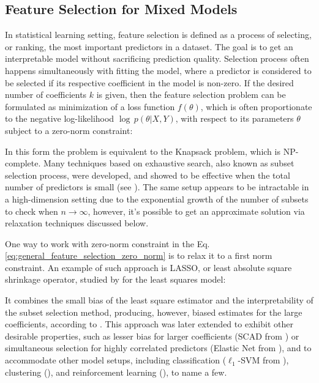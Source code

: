\documentclass[11pt,letterpaper]{article}
\numberwithin{equation}{section} %
\numberwithin{figure}{section} %
\numberwithin{table}{section} %
\begin{document}
\subsection{Feature Selection for Mixed Models}
\label{ch:feature_selection_for_mixed_models}
In statistical learning setting, feature selection is defined as a process of selecting, or ranking, the most important predictors in a dataset. The goal is to get an interpretable model without sacrificing prediction quality. Selection process often happens simultaneously with fitting the model, where a predictor is considered to be selected if its respective coefficient in the model is non-zero. If the desired number of coefficients $k$ is given, then  the feature selection problem can be formulated as minimization of a loss function $f(\theta)$, which is  often proportionate to the negative log-likelihood $\log\, p(\theta| X, Y)$, with respect to its parameters $\theta$ subject to a zero-norm constraint:


 In this form the problem is equivalent to the Knapsack problem, which is NP-complete. Many techniques based on exhaustive search, also known as subset selection process, were developed, and showed to be effective when the total number of predictors is small (see \cite{Muller2013}). The same setup appears to be intractable in a high-dimension setting due to the exponential growth of the number of subsets to check when $n \to \infty$, however, it's possible to get an approximate solution via relaxation techniques discussed below.

 One way to work with zero-norm constraint in the Eq.\ref{eq:general_feature_selection_zero_norm} is to relax it to a first norm constraint. An example of such approach is LASSO, or least absolute square shrinkage operator, studied by \cite{Tibshirani1996} for the least squares model:
 
 
  It combines the small bias of the least square estimator and the interpretability of the subset selection method, producing, however, biased estimates for the large coefficients, according to \cite{Zou2006}.  This approach was later extended to exhibit other desirable properties, such as lesser bias for larger coefficients (SCAD from \cite{Fan2001}) or simultaneous selection for highly correlated predictors (Elastic Net from \cite{Zou2005}), and to accommodate other model setups, including classification ($\ell_1$-SVM from \cite{Bradley1998, Shalev-Shwartz2011, Belyy2018}), clustering (\cite{Jajuga1991}), and reinforcement learning (\cite{Kim2019}), to name a few. 
  
\end{document}
